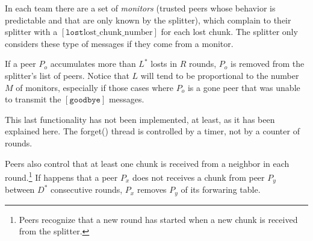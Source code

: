 
\label{sec:free_riding_control}

In each team there are a set of \emph{monitors} (trusted peers whose
behavior is predictable and that are only known by the splitter),
which complain to their splitter with a $[\mathtt{lost}
  \text{lost\_chunk\_number}]$ for each lost chunk. The splitter only
considers these type of messages if they come from a monitor.

If a peer $P_o$ accumulates more than $L^*$ losts in $R$ rounds, $P_o$
is removed from the splitter's list of peers. Notice that $L$ will
tend to be proportional to the number $M$ of monitors, especially if
those cases where $P_o$ is a gone peer that was unable to transmit the
$[\mathtt{goodbye}]$ messages.

\begin{notex}
This last functionality has not been implemented, at least, as it has
been explained here. The forget() thread is controlled by a timer, not
by a counter of rounds.
\end{notex}

Peers also control that at least one chunk is received from a neighbor
in each round.\footnote{Peers recognize that a new round has started
  when a new chunk is received from the splitter.} If happens that a
peer $P_x$ does not receives a chunk from peer $P_y$ between $D^*$
consecutive rounds, $P_x$ removes $P_y$ of its forwaring table.
